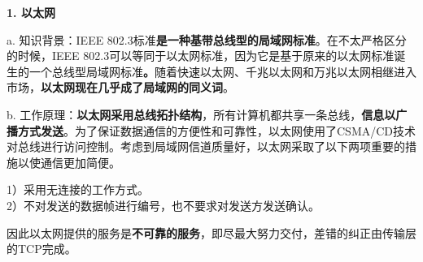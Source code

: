 \textbf{{1. 以太网}}

a. 知识背景：IEEE
802.3标准{\textbf{是一种基带总线型的局域网标准}}。在不太严格区分的时候，IEEE
802.3可以等同于以太网标准，因为它是基于原来的以太网标准诞生的一个总线型局域网标准\textbf{。}{随着快速以太网、千兆以太网和万兆以太网相继进入市场，{\textbf{以太网现在几乎成了局域网的同义词}}。}

b.
工作原理：{\textbf{以太网采用总线拓扑结构}}，所有计算机都共享一条总线，{\textbf{信息以广播方式发送}}。为了保证数据通信的方便性和可靠性，以太网使用了CSMA/CD技术对总线进行访问控制。考虑到局域网信道质量好，以太网采取了以下{两项重要的措施}以使通信更加简便。

1）采用无连接的工作方式。\\

2）不对发送的数据帧进行编号，也不要求对发送方发送确认。

因此以太网提供的服务是{\textbf{不可靠的服务}}，即尽最大努力交付，差错的纠正由传输层的TCP完成。
